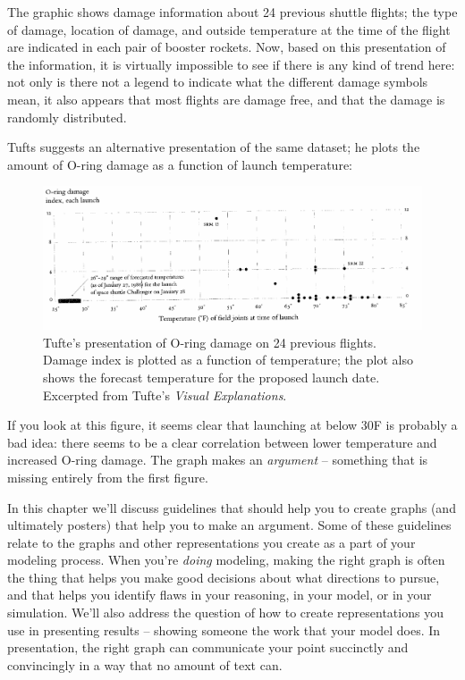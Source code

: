 \documentclass{tufte-handout}
\begin{document}
The graphic shows damage information about 24 previous shuttle flights; the type of damage, location of damage, and outside temperature at the time of the flight are indicated in each pair of booster rockets.  Now, based on this presentation of the information, it is virtually impossible to see if there is any kind of trend here:  not only is there not a legend to indicate what the different damage symbols mean, it also appears that most flights are damage free, and that the damage is randomly distributed.

Tufts suggests an alternative presentation  of the same dataset; he plots the amount of O-ring damage as a function of launch temperature:

\begin{figure}[h!]
\includegraphics[width=7in]{figs/Thiokol2}
\caption{Tufte's presentation of O-ring damage on 24 previous flights.  Damage index is plotted as a function of temperature; the plot also shows the forecast temperature for the proposed launch date.  Excerpted from Tufte's {\it Visual Explanations}.}
\end{figure}

If you look at this figure, it seems clear that launching at below 30\textdegree F is probably a bad idea: there seems to be a clear correlation between lower temperature and increased O-ring damage.  The graph makes an {\it argument} -- something that is missing entirely from the first figure.

In this chapter we'll discuss guidelines that should help you to create graphs (and ultimately posters) that help you to make an argument.  Some of these guidelines relate to the graphs and other representations you create as a part of your modeling process.  When you're {\it doing} modeling, making the right graph is often the thing that helps you make good decisions about what directions to pursue, and that helps you identify flaws in your reasoning, in your model, or in your simulation.  We'll also address the question of how to create representations you use in presenting results -- showing someone the work that your model does.  In presentation, the right graph can communicate your point succinctly and convincingly in a way that no amount of text can.
\end{document}

